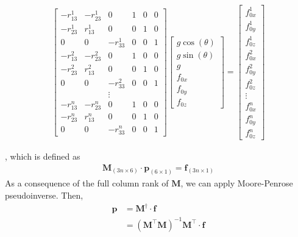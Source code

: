 \begin{equation}
\begin{split}
\begin{bmatrix}
-r_{13}^1		&-r_{23} ^1		&0			&1		&0		&0\\
-r_{23}^1		&r_{13}^1		&0			&0		&1		&0\\
0				&0				&-r_{33}^1	&0		&0		&1\\
-r_{13}^2		&-r_{23}^2 		&0			&1		&0		&0\\
-r_{23}^2		&r_{13}^2		&0			&0		&1		&0\\
0				&0				&-r_{33}^2	&0		&0		&1\\
&&\vdots\\
-r_{13}^n		&-r_{23}^n 		&0			&1		&0		&0\\
-r_{23}^n		&r_{13}^n		&0			&0		&1		&0\\
0				&0				&-r_{33}^n	&0		&0		&1
\end{bmatrix}
\begin{bmatrix}
g\cos(\theta)\\
g\sin(\theta)\\
g\\
f_{0x}\\
f_{0y}\\
f_{0z}
\end{bmatrix}
=
\begin{bmatrix}
f^1_{0x}\\
f^1_{0y}\\
f^1_{0z}\\
f^2_{0x}\\
f^2_{0y}\\
f^2_{0z}\\
\vdots\\
f^n_{0x}\\
f^n_{0y}\\
f^n_{0z}
\end{bmatrix}
\end{split}
\end{equation}
\par
, which is defined as 
\begin{equation}
\begin{split}
\mathbf{M}_{\left(3n \times 6\right)} \cdot \boldsymbol{p}_{\left(6 \times 1\right)} = \boldsymbol{f}_{\left(3n \times 1\right)}
\end{split}
\end{equation}
As a consequence of the full column rank of $\mathbf{M}$, we can apply Moore-Penrose pseudoinverse. Then, 
\begin{equation*}
\begin{split}
\boldsymbol{p} 	&= \mathbf{M}^{\dagger} \cdot \boldsymbol{f}\\
				&= \left( \mathbf{M}^\top\mathbf{M}\right) ^{-1}\mathbf{M}^\top \cdot \boldsymbol{f}
\end{split}
\end{equation*}
